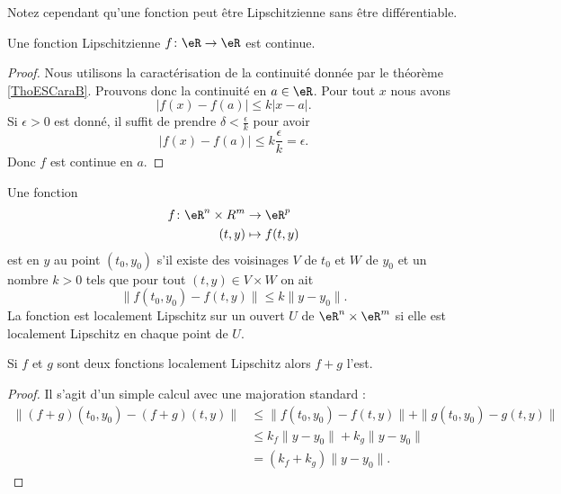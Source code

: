 Notez cependant qu'une fonction peut être Lipschitzienne sans être différentiable.

\begin{proposition} \label{PropFZgFTEW}
    Une fonction Lipschitzienne \( f\colon \eR\to \eR\) est continue.
\end{proposition}

\begin{proof}
    Nous utilisons la caractérisation de la continuité donnée par le théorème \ref{ThoESCaraB}. Prouvons donc la continuité en \( a\in \eR\). Pour tout \( x\) nous avons
    \begin{equation}
        \big| f(x)-f(a) \big|\leq k| x-a |.
    \end{equation}
    Si \( \epsilon>0\) est donné, il suffit de prendre \( \delta<\frac{ \epsilon }{ k }\) pour avoir
    \begin{equation}
        \big| f(x)-f(a) \big|\leq k\frac{ \epsilon }{ k }=\epsilon.
    \end{equation}
    Donc \( f\) est continue en \( a\).
\end{proof}

\begin{definition}      \label{DefJSFFooEOCogV}
    Une fonction 
    \begin{equation}
        \begin{aligned}
            f\colon \eR^n\times R^m&\to \eR^p \\
            (t,y)&\mapsto f(t,y) 
        \end{aligned}
    \end{equation}
    est  en \( y\) au point \( (t_0,y_0)\) s'il existe des voisinages \( V\) de \( t_0\) et \( W\) de \( y_0\) et un nombre \( k>0\) tels que pour tout \( (t,y)\in V\times W\) on ait
    \begin{equation}
        \big\| f(t_0,y_0)-f(t,y) \big\|\leq k\| y-y_0 \|.
    \end{equation}
    La fonction est localement Lipschitz sur un ouvert \( U\) de \( \eR^n\times \eR^m\) si elle est localement Lipschitz en chaque point de \( U\).
\end{definition}

\begin{proposition}     \label{PropGIBZooVsIqfY}
    Si \( f\) et \( g\) sont deux fonctions localement Lipschitz alors \( f+g\) l'est.
\end{proposition}

\begin{proof}
    Il s'agit d'un simple calcul avec une majoration standard :
    \begin{subequations}
        \begin{align}
            \| (f+g)(t_0,y_0)-(f+g)(t,y) \|&\leq \|  f(t_0,y_0)-f(t,y)  \|+\| g(t_0,y_0)-g(t,y) \|\\
            &\leq k_f\| y-y_0 \|+k_g\| y-y_0 \|\\
            &=(k_f+k_g)\| y-y_0 \|.
        \end{align}
    \end{subequations}
\end{proof}


